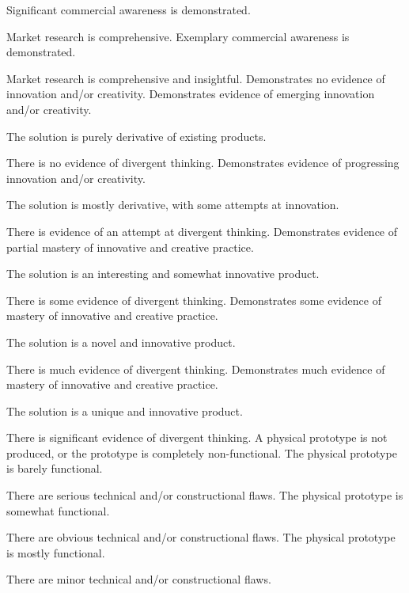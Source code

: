 \documentclass{../fal_assignment}
\begin{document}
\begin{markingrubric}
        \grade Significant commercial awareness is demonstrated.
            \par Market research is comprehensive.
        \grade Exemplary commercial awareness is demonstrated.
            \par Market research is comprehensive and insightful.
        \grade\fail Demonstrates no evidence of innovation and/or creativity.
        \grade Demonstrates evidence of emerging innovation and/or creativity.
            \par The solution is purely derivative of existing products.
            \par There is no evidence of divergent thinking.
        \grade Demonstrates evidence of progressing innovation and/or creativity.
            \par The solution is mostly derivative, with some attempts at innovation.
            \par There is evidence of an attempt at divergent thinking.
        \grade Demonstrates evidence of partial mastery of innovative and creative practice.
            \par The solution is an interesting and somewhat innovative product.
            \par There is some evidence of divergent thinking.
        \grade Demonstrates some evidence of mastery of innovative and creative practice.
            \par The solution is a novel and innovative product.
            \par There is much evidence of divergent thinking.
        \grade Demonstrates much evidence of mastery of innovative and creative practice.
            \par The solution is a unique and innovative product.
            \par There is significant evidence of divergent thinking.
        \grade\fail A physical prototype is not produced, or the prototype is completely non-functional.
        \grade The physical prototype is barely functional.
            \par There are serious technical and/or constructional flaws.
        \grade The physical prototype is somewhat functional.
            \par There are obvious technical and/or constructional flaws.
        \grade The physical prototype is mostly functional.
            \par There are minor technical and/or constructional flaws.

\end{markingrubric}
\end{document}
